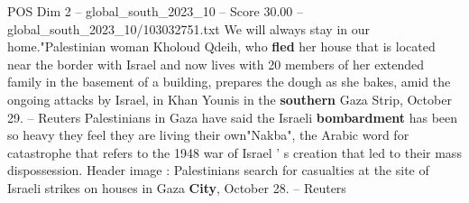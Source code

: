 \begin{textsample}{POS Dim 2 – global\_south\_2023\_10 – Score 30.00 – global\_south\_2023\_10/103032751.txt}
We will always stay in our home."Palestinian woman Kholoud Qdeih, who \textbf{fled} her house that is located near the border with Israel and now lives with 20 members of her extended family in the basement of a building, prepares the dough as she bakes, amid the ongoing attacks by Israel, in Khan Younis in the \textbf{southern} Gaza Strip, October 29. -- Reuters Palestinians in Gaza have said the Israeli \textbf{bombardment} has been so heavy they feel they are living their own"Nakba", the Arabic word for catastrophe that refers to the 1948 war of Israel ' s creation that led to their mass dispossession.
Header image : Palestinians search for casualties at the site of Israeli strikes on houses in Gaza \textbf{City}, October 28. -- Reuters

\end{textsample}

